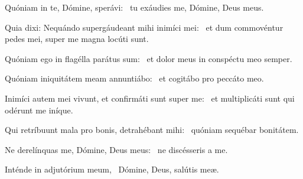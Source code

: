 \item Quóniam in te, Dómine, sperávi:~\psstar{} tu exáudies me, Dómine, Deus meus.

\item Quia dixi: Nequándo supergáudeant mihi inimíci mei:~\psstar{} et dum commovéntur pedes mei, super me magna locúti sunt.

\item Quóniam ego in flagélla parátus sum:~\psstar{} et dolor meus in conspéctu meo semper.

\item Quóniam iniquitátem meam annuntiábo:~\psstar{} et cogitábo pro peccáto meo.

\item Inimíci autem mei vivunt, et confirmáti sunt super me:~\psstar{} et multiplicáti sunt qui odérunt me iníque.

\item Qui retríbuunt mala pro bonis, detrahébant mihi:~\psstar{} quóniam sequébar bonitátem.

\item Ne derelínquas me, Dómine, Deus meus:~\psstar{} ne discésseris a me.

\item Inténde in adjutórium meum,~\psstar{} Dómine, Deus, salútis meæ.

